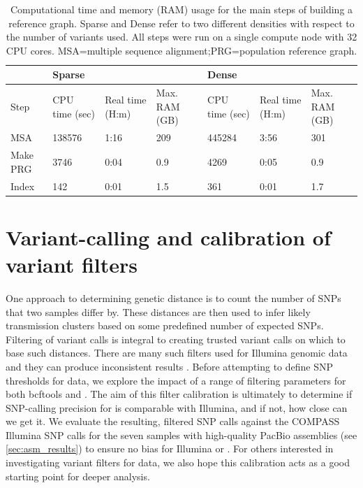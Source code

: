 \begin{table}
\centering
\begin{tabularx}{\textwidth}{|l|X|X|X|X|X|X|}
\hline
         & \multicolumn{3}{l|}{Sparse}                          & \multicolumn{3}{l|}{Dense}                           \\ \hline
Step     & CPU time (sec) & Real time (H:m) & Max. RAM (GB) & CPU time (sec) & Real time (H:m) & Max. RAM (GB) \\ \hline%
MSA      & 138576         & 1:16             & 209              & 445284         & 3:56             & 301              \\ \hline%
Make PRG & 3746           & 0:04             & 0.9              & 4269           & 0:05             & 0.9              \\ \hline%
Index    & 142            & 0:01             & 1.5              & 361            & 0:01             & 1.7              \\ \hline%
\end{tabularx}
\caption{Computational time and memory (RAM) usage for the main steps of building a \mtb{} reference graph. Sparse and Dense refer to two different densities with respect to the number of variants used. All steps were run on a single compute node with 32 CPU cores. MSA=multiple sequence alignment;PRG=population reference graph.}
\label{tab:build-prg}
\end{table}


\section{Variant-calling and calibration of \ont{} variant filters}
\label{sec:var-calls}
One approach to determining genetic distance is to count the number of SNPs that two samples differ by. These distances are then used to infer likely transmission clusters based on some predefined number of expected SNPs.
Filtering of variant calls is integral to creating trusted variant calls on which to base such distances. There are many such filters used for Illumina genomic data
and they can produce inconsistent results \cite{walter2020}. Before
attempting to define SNP thresholds for \ont{} data, we explore the
impact of a range of filtering parameters for both bcftools and \pandora{}.  
The aim of this filter calibration is ultimately to determine if SNP-calling precision for \ont{} is comparable with Illumina, and if not, how close can we get it.
We evaluate the resulting, filtered SNP calls
against the COMPASS \cite{Jajou2019} Illumina SNP calls for the seven
samples with high-quality PacBio assemblies (see \autoref{sec:asm_results}) to ensure no bias for
Illumina or \ont{}.
For others interested in investigating variant filters for \ont{} data, we also hope this calibration acts as a good starting point for deeper analysis.

